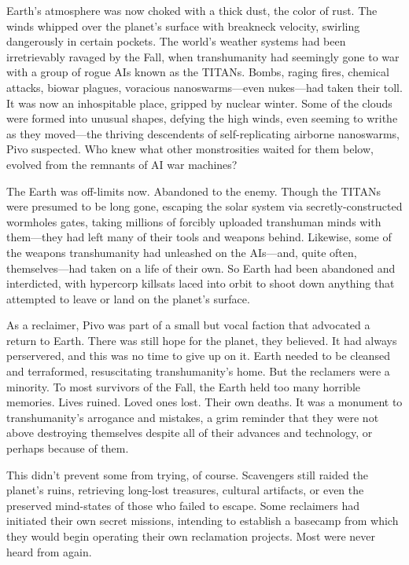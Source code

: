 Earth's atmosphere was now choked with a thick dust, the color of rust. The winds whipped over the planet's surface with breakneck velocity, swirling dangerously in certain pockets. The world's weather systems had been irretrievably ravaged by the Fall, when transhumanity had seemingly gone to war with a group of rogue AIs known as the TITANs. Bombs, raging fires, chemical attacks, biowar plagues, voracious nanoswarms—even nukes—had taken their toll. It was now an inhospitable place, gripped by nuclear winter. Some of the clouds were formed into unusual shapes, defying the high winds, even seeming to writhe as they moved—the thriving descendents of self-replicating airborne nanoswarms, Pivo suspected. Who knew what other monstrosities waited for them below, evolved from the remnants of AI war machines? 

The Earth was off-limits now. Abandoned to the enemy. Though the TITANs were presumed to be long gone, escaping the solar system via secretly-constructed wormholes gates, taking millions of forcibly uploaded transhuman minds with them—they had left many of their tools and weapons behind. Likewise, some of the weapons transhumanity had unleashed on the AIs—and, quite often, themselves—had taken on a life of their own. So Earth had been abandoned and interdicted, with hypercorp killsats laced into orbit to shoot down anything that attempted to leave or land on the planet's surface. 

As a reclaimer, Pivo was part of a small but vocal faction that advocated a return to Earth. There was still hope for the planet, they believed. It had always perservered, and this was no time to give up on it. Earth needed to be cleansed and terraformed, resuscitating transhumanity's home. But the reclamers were a minority. To most survivors of the Fall, the Earth held too many horrible memories. Lives ruined. Loved ones lost. Their own deaths. It was a monument to transhumanity's arrogance and mistakes, a grim reminder that they were not above destroying themselves despite all of their advances and technology, or perhaps because of them. 

This didn't prevent some from trying, of course. Scavengers still raided the planet's ruins, retrieving long-lost treasures, cultural artifacts, or even the preserved mind-states of those who failed to escape. Some reclaimers had initiated their own secret missions, intending to establish a basecamp from which they would begin operating their own reclamation projects. Most were never heard from again. 

